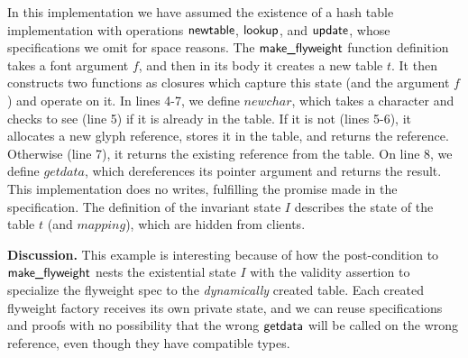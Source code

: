\documentclass[preprint,natbib]{sigplanconf}
\begin{document}
In this implementation we have assumed the existence of a hash table
implementation with operations $\mbox{\textsf{{newtable}}}$, $\mbox{\textsf{{lookup}}}$,
and $\mbox{\textsf{{update}}}$, whose specifications we omit for space
reasons. The $\mbox{\textsf{{make\_flyweight}}}$ function definition takes a
font argument $f$, and then in its body it creates a new table $t$. It
then constructs two functions as closures which capture this state
(and the argument $f$) and operate on it. In lines 4-7, we define
$newchar$, which takes a character and checks to see (line 5) if it is
already in the table. If it is not (lines 5-6), it allocates a new
glyph reference, stores it in the table, and returns the
reference. Otherwise (line 7), it returns the existing reference from
the table.  On line 8, we define $getdata$, which dereferences its
pointer argument and returns the result. This implementation does no
writes, fulfilling the promise made in the specification. The
definition of the invariant state $I$ describes the state of the table
$t$ (and $mapping$), which are hidden from clients.

\textbf{Discussion.} This example is interesting because of how the
post-condition to $\mbox{\textsf{{make\_flyweight}}}$ nests the existential
state $I$ with the validity assertion to specialize the flyweight spec
to the \emph{dynamically} created table. Each created flyweight factory
receives its own private state, and we can reuse specifications and
proofs with no possibility that the wrong $\mbox{\textsf{{getdata}}}$ will be
called on the wrong reference, even though they have compatible types.



\end{document}

